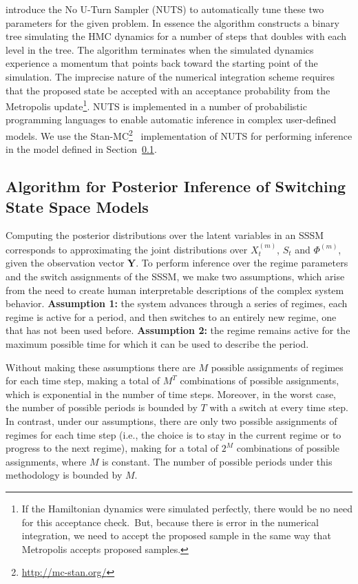 \cite{hoffman2014no} introduce the No U-Turn Sampler (NUTS) to automatically tune these two parameters for the given problem. In essence the algorithm constructs a binary tree simulating the HMC dynamics for a number of steps that doubles with each level in the tree. The algorithm terminates when the simulated dynamics experience a momentum that points back toward the starting point of the simulation. The imprecise nature of the numerical integration scheme requires that the proposed state be accepted with an acceptance probability from the Metropolis update\footnote{If the Hamiltonian dynamics were simulated perfectly, there would be no need for this acceptance check.~But, because there is error in the numerical integration, we need to accept the proposed sample in the same way that Metropolis accepts proposed samples.}. NUTS is implemented in a number of probabilistic programming languages to enable automatic inference in complex user-defined models. We use the Stan-MC\footnote{\url{http://mc-stan.org/}}~\citep{carpenter2016stan} implementation of NUTS for performing inference in the model defined in Section~\ref{sec:posterior_inference_sssm}.

\subsection{Algorithm for Posterior Inference of Switching State Space Models}\label{sec:posterior_inference_sssm}

Computing the posterior distributions over the latent variables in an SSSM corresponds to approximating the joint distributions over $X_t^{(m)}$, $S_t$ and $\Phi^{(m)}$, given the observation vector $\mathbf{Y}$. To perform inference over the regime parameters and the switch assignments of the SSSM, we make two assumptions, which arise from the need to create human interpretable descriptions of the complex system behavior. \textbf{Assumption 1:} the system advances through a series of regimes, each regime is active for a period, and then switches to an entirely new regime, one that has not been used before. \textbf{Assumption 2:} the regime remains active for the maximum possible time for which it can be used to describe the period.

Without making these assumptions there are $M$ possible assignments of regimes for each time step, making a total of $M^T$ combinations of possible assignments, which is exponential in the number of time steps. Moreover, in the worst case, the number of possible periods is bounded by $T$ with a switch at every time step. In contrast, under our assumptions, there are only two possible assignments of regimes for each time step (i.e., the choice is to stay in the current regime or to progress to the next regime), making for a total of $2^M$ combinations of possible assignments, where $M$ is constant.  The number of possible periods under this methodology is bounded by $M$.

